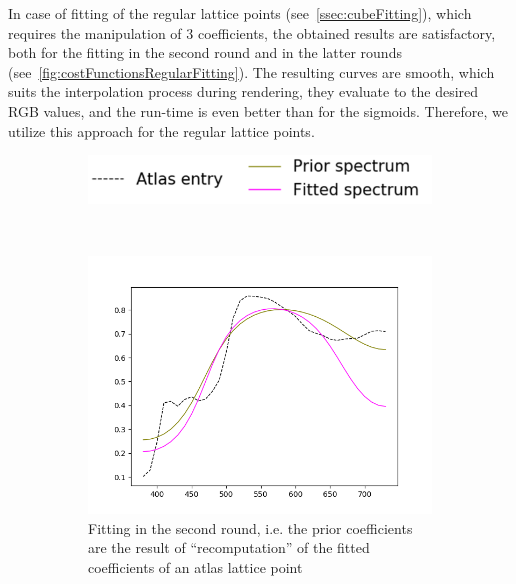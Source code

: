 In case of fitting of the regular lattice points (see~\cref{ssec:cubeFitting}), which requires the manipulation of 3 coefficients, the obtained results are satisfactory, both for the fitting in the second round and in the latter rounds (see~\cref{fig:costFunctionsRegularFitting}). The resulting curves are smooth, which suits the interpolation process during rendering, they evaluate to the desired RGB values, and the run-time is even better than for the sigmoids. Therefore, we utilize this approach for the regular lattice points.

\begin{figure}[t]
	\centering
	\begin{subfigure}[t]{0.4\textwidth}
		\includegraphics[width=\linewidth]{img/cost_functions_regular_legend.png}
	\end{subfigure} \\
	\begin{subfigure}[t]{0.45\textwidth}
	\includegraphics[width=\linewidth]{img/cost_functions_regular_round2.png}
	\caption{Fitting in the second round, i.e. the prior coefficients are the result of ``recomputation'' of the fitted coefficients of an atlas lattice point}
	\label{fig:costFunctionsRegularRound2}
	\end{subfigure} \hspace{0.1em}
	\begin{subfigure}[t]{0.45\textwidth}

\end{subfigure}
\end{figure}
